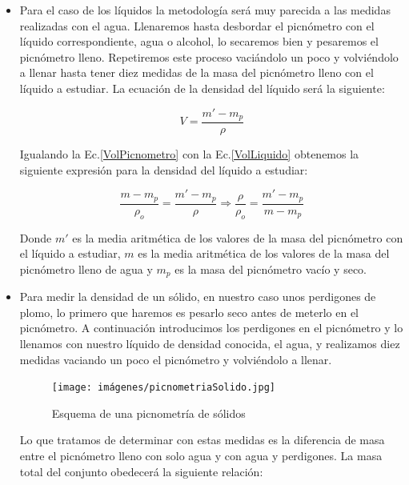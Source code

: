 \documentclass[a4paper,12pt,titlepage]{report}
\begin{document}
\begin{itemize}
    \item Para el caso de los líquidos la metodología será muy parecida a las medidas realizadas con el agua. Llenaremos hasta desbordar el picnómetro con el líquido correspondiente, agua o alcohol, lo secaremos bien y pesaremos el picnómetro lleno. Repetiremos este proceso vaciándolo un poco y volviéndolo a llenar hasta tener diez medidas de la masa del picnómetro lleno con el líquido a estudiar. La ecuación de la densidad del líquido será la siguiente:
    
        \begin{equation}
            V=\frac{m'-m_{p}}{\rho}
            \label{VolLiquido}
        \end{equation}

    Igualando la Ec.\ref{VolPicnometro} con la Ec.\ref{VolLiquido} obtenemos la siguiente expresión para la densidad del líquido a estudiar:

        \begin{equation}
            \frac{m-m_{p}}{\rho_{o}}=\frac{m'-m_{p}}{\rho} \Rightarrow \frac{\rho}{\rho_{o}}=\frac{m'-m_{p}}{m-m_{p}}
            \label{Densidad liq}
        \end{equation}

        Donde $m'$ es la media aritmética de los valores de la masa del picnómetro con el líquido a estudiar, $m$ es la media aritmética de los valores de la masa del picnómetro lleno de agua y $m_{p}$ es la masa del picnómetro vacío y seco.

    \item Para medir la densidad de un sólido, en nuestro caso unos perdigones de plomo, lo primero que haremos es pesarlo seco antes de meterlo en el picnómetro. A continuación introducimos los perdigones en el picnómetro y lo llenamos con nuestro líquido de densidad conocida, el agua, y realizamos diez medidas vaciando un poco el picnómetro y volviéndolo a llenar.
    
    \begin{figure}[h!]
        \centering
        \texttt{[image: imágenes/picnometriaSolido.jpg]}
    
        \caption{Esquema de una picnometría de sólidos}
    \end{figure}

    Lo que tratamos de determinar con  estas medidas es la diferencia de masa entre el picnómetro lleno con solo agua y con agua y perdigones. La masa total del conjunto obedecerá la siguiente relación:
    

\end{itemize}
\end{document}
